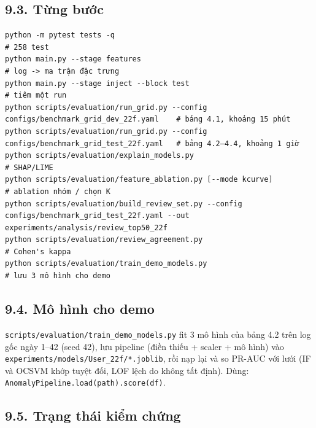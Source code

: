 \documentclass[
  11pt,
]{article}
\begin{document}
\hypertarget{tux1eebng-bux1b0ux1edbc}{%
\subsection{9.3. Từng bước}\label{tux1eebng-bux1b0ux1edbc}}

\begin{Verbatim}[breaklines,breakanywhere,fontsize=\footnotesize]
python -m pytest tests -q                                                  # 258 test
python main.py --stage features                                            # log -> ma trận đặc trưng
python main.py --stage inject --block test                                 # tiêm một run
python scripts/evaluation/run_grid.py --config configs/benchmark_grid_dev_22f.yaml    # bảng 4.1, khoảng 15 phút
python scripts/evaluation/run_grid.py --config configs/benchmark_grid_test_22f.yaml   # bảng 4.2–4.4, khoảng 1 giờ
python scripts/evaluation/explain_models.py                                # SHAP/LIME
python scripts/evaluation/feature_ablation.py [--mode kcurve]              # ablation nhóm / chọn K
python scripts/evaluation/build_review_set.py --config configs/benchmark_grid_test_22f.yaml --out experiments/analysis/review_top50_22f
python scripts/evaluation/review_agreement.py                              # Cohen's kappa
python scripts/evaluation/train_demo_models.py                             # lưu 3 mô hình cho demo
\end{Verbatim}

\hypertarget{muxf4-huxecnh-cho-demo}{%
\subsection{9.4. Mô hình cho demo}\label{muxf4-huxecnh-cho-demo}}

\texttt{scripts/\allowbreak{}evaluation/\allowbreak{}train\_\allowbreak{}demo\_\allowbreak{}models.\allowbreak{}py}
fit 3 mô hình của bảng 4.2 trên log gốc ngày 1--42 (seed 42), lưu
pipeline (điền thiếu + scaler + mô hình) vào
\texttt{experiments/\allowbreak{}models/\allowbreak{}User\_\allowbreak{}22f/\allowbreak{}*.\allowbreak{}joblib},
rồi nạp lại và so PR-AUC với lưới (IF và OCSVM khớp tuyệt đối, LOF lệch
do không tất định). Dùng:
\texttt{AnomalyPipeline.\allowbreak{}load(\allowbreak{}path).\allowbreak{}score(\allowbreak{}df)}.

\hypertarget{trux1ea1ng-thuxe1i-kiux1ec3m-chux1ee9ng}{%
\subsection{9.5. Trạng thái kiểm
chứng}\label{trux1ea1ng-thuxe1i-kiux1ec3m-chux1ee9ng}}
\end{document}
